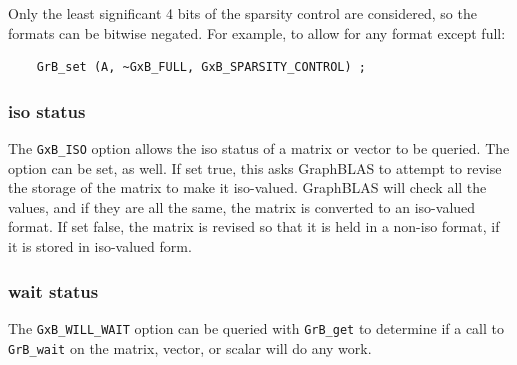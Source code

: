 Only the least significant 4 bits of the sparsity control are considered, so
the formats can be bitwise negated.  For example, to allow for any format
except full:

{\footnotesize
\begin{verbatim}
    GrB_set (A, ~GxB_FULL, GxB_SPARSITY_CONTROL) ; \end{verbatim}}

\subsubsection{iso status}
\label{iso_status}

The \verb'GxB_ISO' option allows the iso status of a matrix or vector to be
queried.  The option can be set, as well.  If set true, this asks GraphBLAS to
attempt to revise the storage of the matrix to make it iso-valued.  GraphBLAS
will check all the values, and if they are all the same, the matrix is
converted to an iso-valued format.  If set false, the matrix is revised so that
it is held in a non-iso format, if it is stored in iso-valued form.

\subsubsection{wait status}
\label{wait_status}

The \verb'GxB_WILL_WAIT' option can be queried with \verb'GrB_get' to determine
if a call to \verb'GrB_wait' on the matrix, vector, or scalar will do any work.


